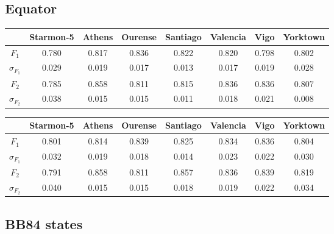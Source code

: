 \subsection{Equator}

\begin{table}[H]
    \centering
    \begin{tabular}{|c|c|c|c|c|c|c|c|}
    \hline
    \textbf{} & \textbf{Starmon-5} & \textbf{Athens} & \textbf{Ourense} & \textbf{Santiago} & \textbf{Valencia} & \textbf{Vigo} & \textbf{Yorktown} \\ \hline
    $F_1$              & 0.780 & 0.817 & 0.836 & 0.822 & 0.820 & 0.798 & 0.802 \\ \hline
    $\sigma_{F_1}$     & 0.029 & 0.019 & 0.017 & 0.013 & 0.017 & 0.019 & 0.028 \\ \hline
    $F_2$              & 0.785 & 0.858 & 0.811 & 0.815 & 0.836 & 0.836 & 0.807 \\ \hline
    $\sigma_{F_2}$     & 0.038 & 0.015 & 0.015 & 0.011 & 0.018 & 0.021 & 0.008 \\ \hline
    \end{tabular}
\end{table}

\begin{table}[H]
    \centering
    \begin{tabular}{|c|c|c|c|c|c|c|c|}
    \hline
    \textbf{} & \textbf{Starmon-5} & \textbf{Athens} & \textbf{Ourense} & \textbf{Santiago} & \textbf{Valencia} & \textbf{Vigo} & \textbf{Yorktown} \\ \hline
    $F_1$              & 0.801 & 0.814 & 0.839 & 0.825 & 0.834 & 0.836 & 0.804 \\ \hline
    $\sigma_{F_1}$     & 0.032 & 0.019 & 0.018 & 0.014 & 0.023 & 0.022 & 0.030 \\ \hline
    $F_2$              & 0.791 & 0.858 & 0.811 & 0.857 & 0.836 & 0.839 & 0.819 \\ \hline
    $\sigma_{F_2}$     & 0.040 & 0.015 & 0.015 & 0.018 & 0.019 & 0.022 & 0.034 \\ \hline
    \end{tabular}
\end{table}
\subsection{BB84 states}

